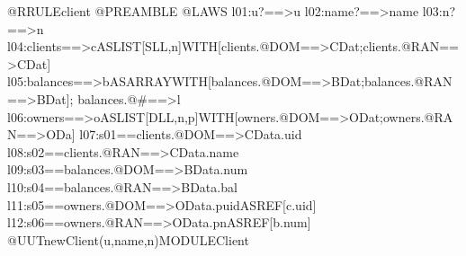 @RRULEclient
@PREAMBLE
@LAWS
l01:u?==>u
l02:name?==>name
l03:n?==>n
l04:clients==>cASLIST[SLL,n]WITH[clients.@DOM==>CDat;clients.@RAN==>CDat]
l05:balances==>bASARRAYWITH[balances.@DOM==>BDat;balances.@RAN==>BDat];
balances.@#==>l
l06:owners==>oASLIST[DLL,n,p]WITH[owners.@DOM==>ODat;owners.@RAN==>ODa]
l07:s01==clients.@DOM==>CData.uid
l08:s02==clients.@RAN==>CData.name
l09:s03==balances.@DOM==>BData.num
l10:s04==balances.@RAN==>BData.bal
l11:s05==owners.@DOM==>OData.puidASREF[c.uid]
l12:s06==owners.@RAN==>OData.pnASREF[b.num]
@UUTnewClient(u,name,n)MODULEClient

